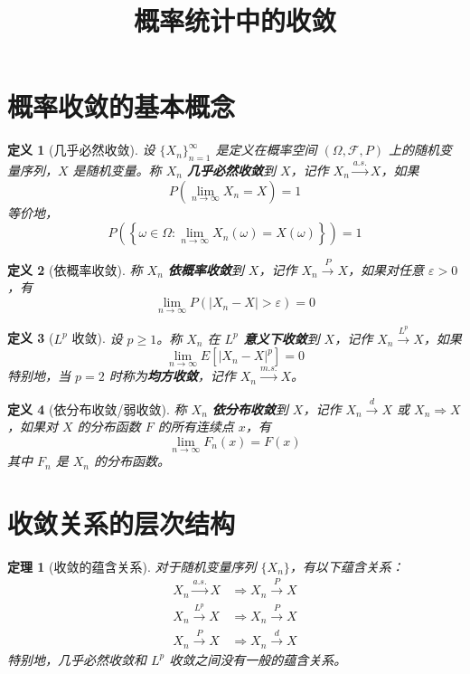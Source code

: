 \documentclass[12pt]{article}
\newtheorem{definition}{定义}
\newtheorem{theorem}{定理}
\begin{document}
\title{概率统计中的收敛}
\author{}
\date{}
\maketitle

\section{概率收敛的基本概念}

\begin{definition}[几乎必然收敛]
设 $\{X_n\}_{n=1}^{\infty}$ 是定义在概率空间 $(\Omega, \mathcal{F}, P)$ 上的随机变量序列，$X$ 是随机变量。称 $X_n$ \textbf{几乎必然收敛}到 $X$，记作 $X_n \xrightarrow{a.s.} X$，如果
$$P\left(\lim_{n \to \infty} X_n = X\right) = 1$$
等价地，
$$P\left(\left\{\omega \in \Omega : \lim_{n \to \infty} X_n(\omega) = X(\omega)\right\}\right) = 1$$
\end{definition}

\begin{definition}[依概率收敛]
称 $X_n$ \textbf{依概率收敛}到 $X$，记作 $X_n \xrightarrow{P} X$，如果对任意 $\varepsilon > 0$，有
$$\lim_{n \to \infty} P(|X_n - X| > \varepsilon) = 0$$
\end{definition}

\begin{definition}[$L^p$ 收敛]
设 $p \geq 1$。称 $X_n$ 在 \textbf{$L^p$ 意义下收敛}到 $X$，记作 $X_n \xrightarrow{L^p} X$，如果
$$\lim_{n \to \infty} E[|X_n - X|^p] = 0$$
特别地，当 $p = 2$ 时称为\textbf{均方收敛}，记作 $X_n \xrightarrow{m.s.} X$。
\end{definition}

\begin{definition}[依分布收敛/弱收敛]
称 $X_n$ \textbf{依分布收敛}到 $X$，记作 $X_n \xrightarrow{d} X$ 或 $X_n \Rightarrow X$，如果对 $X$ 的分布函数 $F$ 的所有连续点 $x$，有
$$\lim_{n \to \infty} F_n(x) = F(x)$$
其中 $F_n$ 是 $X_n$ 的分布函数。
\end{definition}

\section{收敛关系的层次结构}

\begin{theorem}[收敛的蕴含关系]
对于随机变量序列 $\{X_n\}$，有以下蕴含关系：
\begin{align}
X_n \xrightarrow{a.s.} X &\Rightarrow X_n \xrightarrow{P} X \\
X_n \xrightarrow{L^p} X &\Rightarrow X_n \xrightarrow{P} X \\
X_n \xrightarrow{P} X &\Rightarrow X_n \xrightarrow{d} X
\end{align}
特别地，几乎必然收敛和 $L^p$ 收敛之间没有一般的蕴含关系。
\end{theorem}
\end{document}
